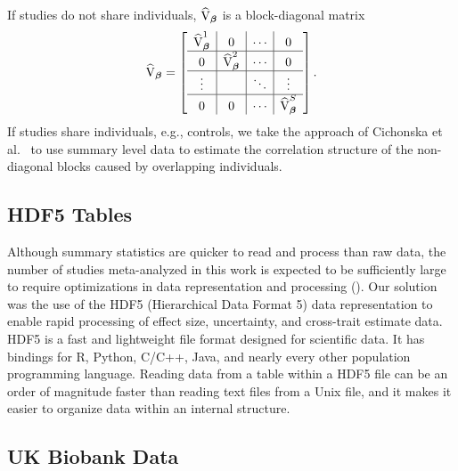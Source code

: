 If studies do not share individuals, $\widehat{\mathbf{\textrm{V}}}_{{\boldsymbol {\beta}}}$ is a block-diagonal matrix 
$$\widehat{\mathbf{\textrm{V}}}_{{\boldsymbol {\beta}}}=
 \left[\begin{array}{c|c|c|c}
 \widehat{\mathbf{\textrm{V}}}^{1}_{{\boldsymbol \beta}} & 0 & \cdots &0\\ \hline
0 & \widehat{\mathbf{\textrm{V}}}^{2}_{{\boldsymbol \beta}}&\cdots &0 \\ \hline
\vdots & &\ddots &\vdots \\ \hline
0 & 0 &\cdots & \widehat{\mathbf{\textrm{V}}}^{S}_{{\boldsymbol {\beta}}}\\
\end{array}\right].$$
If studies share individuals, e.g., controls, 
we take the approach of Cichonska et al.~\cite{cichonska2016metacca} to use summary level data
to estimate the correlation structure of the non-diagonal blocks caused by overlapping individuals. 

\subsection*{HDF5 Tables}
Although summary statistics are quicker to read and process than raw data, the number of studies meta-analyzed in this work is expected to be sufficiently large to require optimizations in data representation and processing (). Our solution was the use of the HDF5 (Hierarchical Data Format 5) data representation to enable rapid processing of effect size, uncertainty, and cross-trait estimate data. HDF5 is a fast and lightweight file format designed for scientific data. It has bindings for R, Python, C/C++, Java, and nearly every other population programming language. Reading data from a table within a HDF5 file can be an order of magnitude faster than reading text files from a Unix file, and it makes it easier to organize data within an internal structure.

\subsection*{UK Biobank Data}
